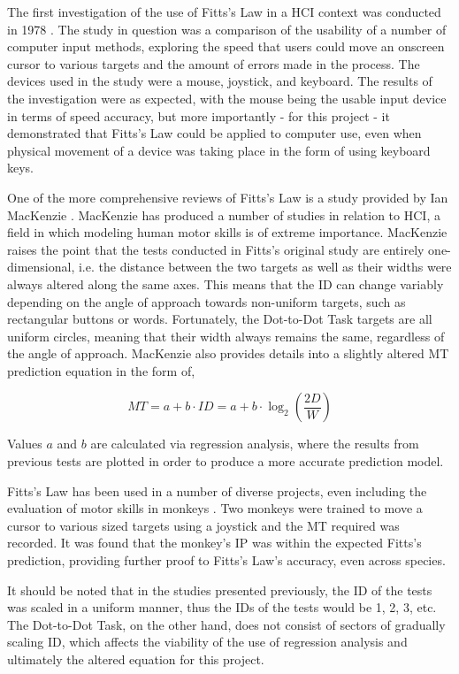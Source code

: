 		The first investigation of the use of Fitts’s Law in a HCI context was conducted in 1978 \cite{Card1978}. The study in question was a comparison of the usability of a number of computer input methods, exploring the speed that users could move an onscreen cursor to various targets and the amount of errors made in the process. The devices used in the study were a mouse, joystick, and keyboard. The results of the investigation were as expected, with the mouse being the usable input device in terms of speed accuracy, but more importantly - for this project - it demonstrated that Fitts’s Law could be applied to computer use, even when physical movement of a device was taking place in the form of using keyboard keys.
		
		One of the more comprehensive reviews of Fitts’s Law is a study provided by Ian MacKenzie \citeyear{MacKenzie1995}. MacKenzie has produced a number of studies in relation to HCI, a field in which modeling human motor skills is of extreme importance. MacKenzie raises the point that the tests conducted in Fitts’s original study are entirely one-dimensional, i.e. the distance between the two targets as well as their widths were always altered along the same axes. This means that the ID can change variably depending on the angle of approach towards non-uniform targets, such as rectangular buttons or words. Fortunately, the Dot-to-Dot Task targets are all uniform circles, meaning that their width always remains the same, regardless of the angle of approach. MacKenzie also provides details into a slightly altered MT prediction equation in the form of,
		
		\[MT = a+b \cdot ID = a+b \cdot \log_2 \left( \frac{2D}{W} \right) \]
		
		Values \(a\) and \(b\) are calculated via regression analysis, where the results from previous tests are plotted in order to produce a more accurate prediction model.
		
		Fitts’s Law has been used in a number of diverse projects, even including the evaluation of motor skills in monkeys \cite{Ifft2011}. Two monkeys were trained to move a cursor to various sized targets using a joystick and the MT required was recorded. It was found that the monkey’s IP was within the expected Fitts’s prediction, providing further proof to Fitts’s Law’s accuracy, even across species.
		
		It should be noted that in the studies presented previously, the ID of the tests was scaled in a uniform manner, thus the IDs of the tests would be 1, 2, 3, etc. The Dot-to-Dot Task, on the other hand, does not consist of sectors of gradually scaling ID, which affects the viability of the use of regression analysis and ultimately the altered equation for this project.
		
